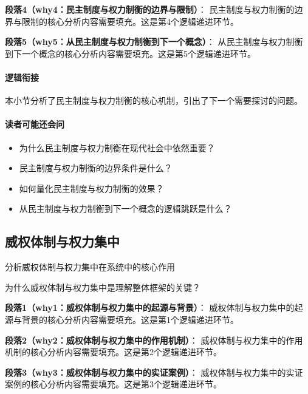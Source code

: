 \documentclass[../main.tex]{subfiles}
\begin{document}
{{\textbf{段落4（why4：民主制度与权力制衡的边界与限制）}：
民主制度与权力制衡的边界与限制的核心分析内容需要填充。这是第4个逻辑递进环节。


\textbf{段落5（why5：从民主制度与权力制衡到下一个概念）}：
从民主制度与权力制衡到下一个概念的核心分析内容需要填充。这是第5个逻辑递进环节。


\paragraph*{逻辑衔接}
本小节分析了民主制度与权力制衡的核心机制，引出了下一个需要探讨的问题。

\paragraph*{读者可能还会问}
\begin{itemize}
\item 为什么民主制度与权力制衡在现代社会中依然重要？
\item 民主制度与权力制衡的边界条件是什么？
\item 如何量化民主制度与权力制衡的效果？
\item 从民主制度与权力制衡到下一个概念的逻辑跳跃是什么？
\end{itemize}


\subsection{威权体制与权力集中}

\begin{motivation}
分析威权体制与权力集中在系统中的核心作用
\end{motivation}

\begin{logicmap}
[逻辑链占位]
\end{logicmap}

\begin{questionbox}
为什么威权体制与权力集中是理解整体框架的关键？
\end{questionbox}

\textbf{段落1（why1：威权体制与权力集中的起源与背景）}：
威权体制与权力集中的起源与背景的核心分析内容需要填充。这是第1个逻辑递进环节。


\textbf{段落2（why2：威权体制与权力集中的作用机制）}：
威权体制与权力集中的作用机制的核心分析内容需要填充。这是第2个逻辑递进环节。


\textbf{段落3（why3：威权体制与权力集中的实证案例）}：
威权体制与权力集中的实证案例的核心分析内容需要填充。这是第3个逻辑递进环节。


}}
\end{document}
